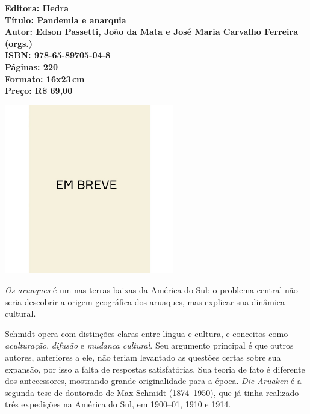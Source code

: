 \vfill
\noindent\begin{minipage}[c]{.5\linewidth}
{\small\textbf{
\hspace*{-.1cm}Editora: Hedra\\
Título: Pandemia e anarquia\\
Autor: Edson Passetti, João da Mata e José Maria Carvalho Ferreira (orgs.)\\ 
ISBN: 978-65-89705-04-8\\
Páginas: 220\\
Formato: 16x23\,cm\\
Preço: R\$ 69,00\\
}}
\end{minipage}
\pagebreak

\begin{center}
\hspace*{-3.6cm}
\hspace*{3.1cm}\includegraphics[width=74mm]{./CAPAS/breve.jpeg}
\end{center}
\hspace*{-7cm}\hrulefill\hspace*{-7cm}
\medskip

\noindent{}\textit{Os aruaques} é um  nas terras baixas da América do Sul: o problema central não seria descobrir a origem geográfica dos aruaques, mas explicar sua dinâmica cultural. 

Schmidt opera com distinções claras entre língua e cultura, e conceitos como \textit{aculturação}, \textit{difusão} e \textit{mudança cultural}. Seu argumento principal é que outros autores, anteriores a ele, não teriam levantado as questões certas sobre sua expansão, por isso a falta de respostas satisfatórias. Sua teoria de fato é diferente dos antecessores, mostrando grande originalidade para a época. \textit{Die Aruaken} é a segunda tese de doutorado de Max Schmidt (1874--1950), que já tinha realizado três expedições na América do Sul, em 1900--01, 1910 e 1914.

